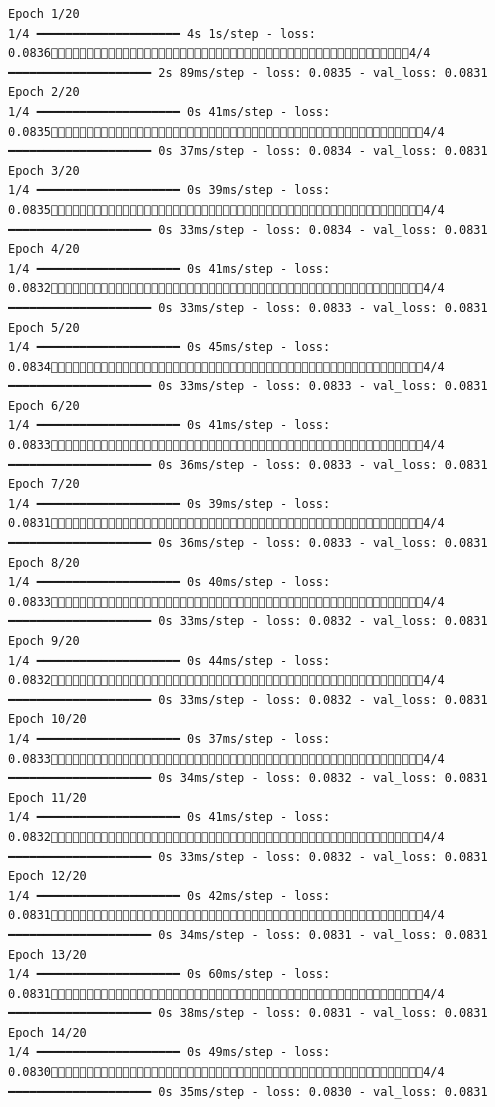 \documentclass[
  letterpaper,
  DIV=11,
  numbers=noendperiod]{scrreprt}
\begin{document}
\begin{verbatim}
Epoch 1/20
1/4 ━━━━━━━━━━━━━━━━━━━━ 4s 1s/step - loss: 0.08364/4 ━━━━━━━━━━━━━━━━━━━━ 2s 89ms/step - loss: 0.0835 - val_loss: 0.0831
Epoch 2/20
1/4 ━━━━━━━━━━━━━━━━━━━━ 0s 41ms/step - loss: 0.08354/4 ━━━━━━━━━━━━━━━━━━━━ 0s 37ms/step - loss: 0.0834 - val_loss: 0.0831
Epoch 3/20
1/4 ━━━━━━━━━━━━━━━━━━━━ 0s 39ms/step - loss: 0.08354/4 ━━━━━━━━━━━━━━━━━━━━ 0s 33ms/step - loss: 0.0834 - val_loss: 0.0831
Epoch 4/20
1/4 ━━━━━━━━━━━━━━━━━━━━ 0s 41ms/step - loss: 0.08324/4 ━━━━━━━━━━━━━━━━━━━━ 0s 33ms/step - loss: 0.0833 - val_loss: 0.0831
Epoch 5/20
1/4 ━━━━━━━━━━━━━━━━━━━━ 0s 45ms/step - loss: 0.08344/4 ━━━━━━━━━━━━━━━━━━━━ 0s 33ms/step - loss: 0.0833 - val_loss: 0.0831
Epoch 6/20
1/4 ━━━━━━━━━━━━━━━━━━━━ 0s 41ms/step - loss: 0.08334/4 ━━━━━━━━━━━━━━━━━━━━ 0s 36ms/step - loss: 0.0833 - val_loss: 0.0831
Epoch 7/20
1/4 ━━━━━━━━━━━━━━━━━━━━ 0s 39ms/step - loss: 0.08314/4 ━━━━━━━━━━━━━━━━━━━━ 0s 36ms/step - loss: 0.0833 - val_loss: 0.0831
Epoch 8/20
1/4 ━━━━━━━━━━━━━━━━━━━━ 0s 40ms/step - loss: 0.08334/4 ━━━━━━━━━━━━━━━━━━━━ 0s 33ms/step - loss: 0.0832 - val_loss: 0.0831
Epoch 9/20
1/4 ━━━━━━━━━━━━━━━━━━━━ 0s 44ms/step - loss: 0.08324/4 ━━━━━━━━━━━━━━━━━━━━ 0s 33ms/step - loss: 0.0832 - val_loss: 0.0831
Epoch 10/20
1/4 ━━━━━━━━━━━━━━━━━━━━ 0s 37ms/step - loss: 0.08334/4 ━━━━━━━━━━━━━━━━━━━━ 0s 34ms/step - loss: 0.0832 - val_loss: 0.0831
Epoch 11/20
1/4 ━━━━━━━━━━━━━━━━━━━━ 0s 41ms/step - loss: 0.08324/4 ━━━━━━━━━━━━━━━━━━━━ 0s 33ms/step - loss: 0.0832 - val_loss: 0.0831
Epoch 12/20
1/4 ━━━━━━━━━━━━━━━━━━━━ 0s 42ms/step - loss: 0.08314/4 ━━━━━━━━━━━━━━━━━━━━ 0s 34ms/step - loss: 0.0831 - val_loss: 0.0831
Epoch 13/20
1/4 ━━━━━━━━━━━━━━━━━━━━ 0s 60ms/step - loss: 0.08314/4 ━━━━━━━━━━━━━━━━━━━━ 0s 38ms/step - loss: 0.0831 - val_loss: 0.0831
Epoch 14/20
1/4 ━━━━━━━━━━━━━━━━━━━━ 0s 49ms/step - loss: 0.08304/4 ━━━━━━━━━━━━━━━━━━━━ 0s 35ms/step - loss: 0.0830 - val_loss: 0.0831

\end{verbatim}
\end{document}
